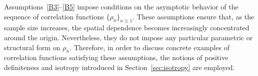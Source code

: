 \documentclass[12pt]{report} %
\newcommand{\bx}{\mathbf{x}}
\newcommand{\by}{\mathbf{y}}
\newcommand{\bSigma}{\boldsymbol\Sigma}
\begin{document}
Assumptions~\ref{B3}--\ref{B5} impose conditions on the asymptotic behavior of the sequence of correlation functions $\{\rho_n\}_{n\geq 1}$. These assumptions ensure that, as the sample size increases, the spatial dependence becomes increasingly concentrated around the origin. Nevertheless, they do not impose any particular parametric or structural form on $\rho_n$.  Therefore, in order to discuss concrete examples of correlation functions satisfying these assumptions, the notions of positive definiteness and isotropy introduced in Section~\ref{sec:isotropy} are employed.

\end{document}
